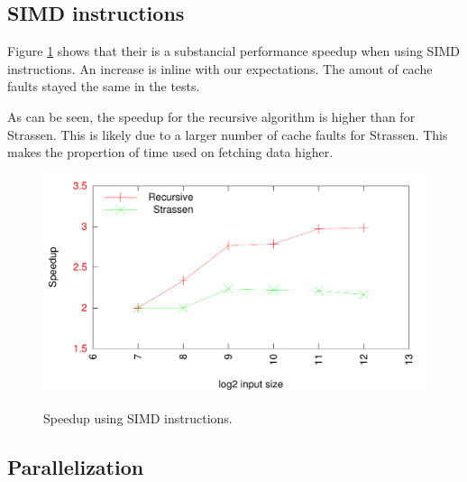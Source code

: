 



\subsection{SIMD instructions}

Figure \ref{fig:simd} shows that their is a substancial performance speedup when using SIMD instructions. An increase is inline with our expectations. The amout of cache faults stayed the same in the tests. 

As can be seen, the speedup for the recursive algorithm is higher than for Strassen. This is likely due to a larger number of cache faults for Strassen. This makes the propertion of time used on fetching data higher.

\begin{figure}[h!]
  \centering
  \includegraphics[width=\textwidth]{"../project2/gnuplots/simd_performance"}
  \label{fig:simd}
  \caption{Speedup using SIMD instructions.}
\end{figure}

\subsection{Parallelization}

